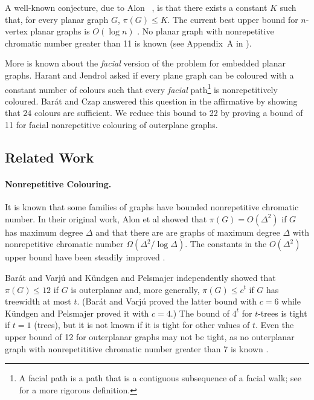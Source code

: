 \documentclass{patmorin}
\begin{document}
A well-known conjecture, due to Alon \etal\ \cite{alon2002nonrepetitive},
is that there exists a constant $K$ such that, for every planar graph
$G$, $\pi(G) \leq K$.  The current best upper bound for $n$-vertex planar
graphs is $O(\log n)$ \cite{dujmovic2012planarlogn}. No planar graph with
nonrepetitive chromatic number greater than 11 is known (see Appendix~A
in \cite{dujmovic2012planarlogn}).

More is known about the \emph{facial} version of the problem for embedded
planar graphs.  Harant and Jendrol \cite{harant2012nonrepetitive} asked
if every plane graph can be coloured with a constant number of colours
such that every \emph{facial} path\footnote{A facial path is a path
that is a contiguous subsequence of a facial walk; see  for a
more rigorous definition.}
is nonrepetitively coloured.  Barát and Czap \cite{barat2013facial}
answered this question in the affirmative by showing that $24$ colours
are sufficient.  We reduce this bound to 22 by proving a bound of 11
for facial nonrepetitive colouring of outerplane graphs.

\subsection{Related Work}

\paragraph{Nonrepetitive Colouring.}

It is known that some families of graphs have bounded
nonrepetitive chromatic number.  In their original work, Alon et
al \cite{alon2002nonrepetitive} showed that $\pi(G)
= O(\Delta^2)$ if $G$ has maximum degree $\Delta$ and that there
are are graphs of maximum degree $\Delta$ with nonrepetitive
chromatic number $\Omega(\Delta^2/\log \Delta)$.  The constants
in the $O(\Delta^2)$ upper bound have been steadily improved
\cite{dujmovic2011nonrepetitive,grytczuk2007nonrepetitivesurvey,grytczuk2007nonrepetitive,harant2012nonrepetitive}.

Barát and Varjú \cite{barat2007square} and K{\"u}ndgen and Pelsmajer
\cite{kundgen2008nonrepetitive} independently showed that $\pi(G)\le
12$ if $G$ is outerplanar and, more generally, $\pi(G)\le c^t$ if $G$
has treewidth at most $t$.  (Barát and Varjú proved the latter bound
with $c=6$ while K{\"u}ndgen and Pelsmajer proved it with $c=4$.)
The bound of $4^t$ for $t$-trees is tight if $t=1$ (trees), but it
is not known if it is tight for other values of $t$. Even the upper
bound of 12 for outerplanar graphs may not be tight, as no outerplanar
graph with nonrepetititive chromatic number greater than 7 is known
\cite{barat2007square}.
\end{document}
